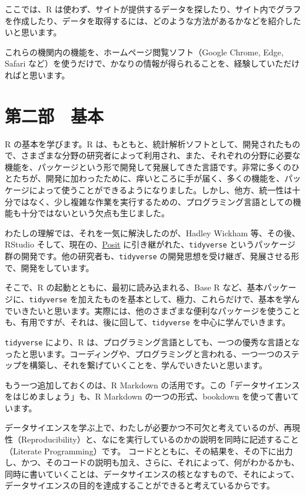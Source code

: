 \documentclass[
  xelatex, ja=standard]{bxjsbook}
\theoremstyle{definition}
\theoremstyle{definition}
\theoremstyle{definition}
\theoremstyle{definition}
\theoremstyle{remark}
\begin{document}
ここでは、R は使わず、サイトが提供するデータを探したり、サイト内でグラフを作成したり、データを取得するには、どのような方法があるかなどを紹介したいと思います。

これらの機関内の機能を、ホームページ閲覧ソフト（Google Chrome, Edge, Safari など）を使うだけで、かなりの情報が得られることを、経験していただければと思います。

\hypertarget{ux7b2cux4e8cux90e8-ux57faux672c}{%
\section{第二部　基本}\label{ux7b2cux4e8cux90e8-ux57faux672c}}

R の基本を学びます。R は、もともと、統計解析ソフトとして、開発されたもので、さまざまな分野の研究者によって利用され、また、それぞれの分野に必要な機能を、パッケージという形で開発して発展してきた言語です。非常に多くのひとたちが、開発に加わったために、痒いところに手が届く、多くの機能を、パッケージによって使うことができるようになりました。しかし、他方、統一性は十分ではなく、少し複雑な作業を実行するための、プログラミング言語としての機能も十分ではないという欠点も生じました。

わたしの理解では、それを一気に解決したのが、Hadley Wickham 等、その後、RStudio そして、現在の、\href{https://posit.co}{Posit} に引き継がれた、\texttt{tidyverse} というパッケージ群の開発です。他の研究者も、\texttt{tidyverse} の開発思想を受け継ぎ、発展させる形で、開発をしています。

そこで、R の起動とともに、最初に読み込まれる、Base R など、基本パッケージに、\texttt{tidyverse} を加えたものを基本として、極力、これらだけで、基本を学んでいきたいと思います。実際には、他のさまざまな便利なパッケージを使うことも、有用ですが、それは、後に回して、\texttt{tidyverse} を中心に学んでいきます。

\texttt{tidyverse} により、R は、プログラミング言語としても、一つの優秀な言語となったと思います。コーディングや、プログラミングと言われる、一つ一つのステップを構築し、それを繋げていくことを、学んでいきたいと思います。

もう一つ追加しておくのは、R Markdown の活用です。この「データサイエンスをはじめましょう」も、R Markdown の一つの形式、bookdown を使って書いています。

データサイエンスを学ぶ上で、わたしが必要かつ不可欠と考えているのが、再現性（Reproducibility）と、なにを実行しているのかの説明を同時に記述すること（Literate Programming）です。 コードとともに、その結果を、その下に出力し、かつ、そのコードの説明も加え、さらに、それによって、何がわかるかも、同時に書いていくことは、データサイエンスの核となすもので、それによって、データサイエンスの目的を達成することができると考えているからです。
\end{document}
